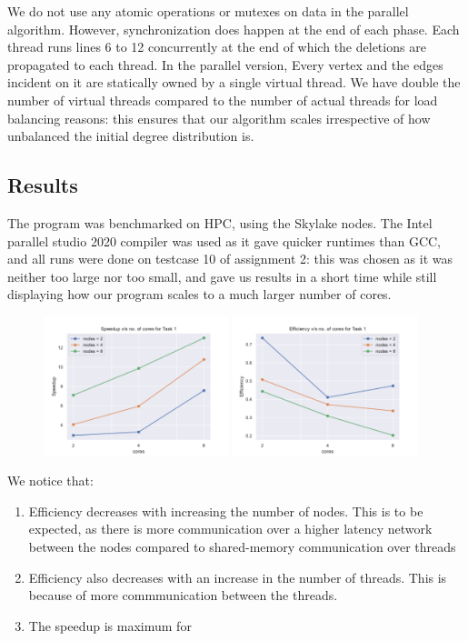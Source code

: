 \documentclass[12pt]{article}
\begin{document}
 We do not use any atomic operations or mutexes on data in the parallel
 algorithm. However, synchronization does happen at the end of each phase. Each
 thread runs lines 6 to 12 concurrently at the end of which the deletions are
 propagated to each thread. In the parallel version, Every vertex and the edges
 incident on it are statically owned by a single virtual thread. We have double the number
 of virtual threads compared to the number of actual threads for load balancing
 reasons: this ensures that our algorithm scales irrespective of how unbalanced
 the initial degree distribution is.

\subsection*{Results}

The program was benchmarked on HPC, using the Skylake nodes. The Intel parallel 
studio 2020 compiler was used as it gave quicker runtimes than GCC, and all
runs were done on testcase 10 of assignment 2: this was chosen as it was
neither too large nor too small, and gave us results in a short time while
still displaying how our program scales to a much larger number of cores.

\begin{figure}[!htbp]
    \centering
    \includegraphics[width=0.48\textwidth]{speedup_t1.pdf}
    \includegraphics[width=0.48\textwidth]{efficiency_t1.pdf}
\end{figure}

We notice that:
\begin{enumerate}
    \item Efficiency decreases with increasing the number of nodes. This is to 
        be expected, as there is more communication over a higher latency
        network between the nodes compared to shared-memory communication over
        threads
    \item Efficiency also decreases with an increase in the number of threads. 
        This is because of more commmunication between the threads.
    \item The speedup is maximum for 
\end{enumerate}
\end{document}
